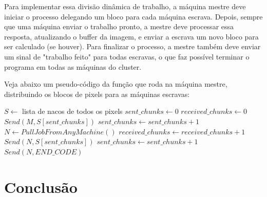 \documentclass[12pt]{article}
\begin{document}
Para implementar essa divisão dinâmica de trabalho, a máquina mestre 
deve iniciar o processo delegando um bloco para cada máquina escrava.
Depois, sempre que uma máquina enviar o trabalho pronto, a mestre deve
processar essa resposta, atualizando o buffer da imagem, e enviar a
escrava um novo bloco para ser calculado (se houver). Para finalizar o
processo, a mestre também deve enviar um sinal de "trabalho feito" para
todas escravas, o que faz possível terminar o programa em todas as 
máquinas do cluster.

Veja abaixo um pseudo-código da função que roda na máquina mestre, 
distribuindo os blocos de pixels para as máquinas escravas:
\begin{algorithmic}[1]
    \State $S \gets $ lista de nacos de todos os pixels
    \State $sent\_chunks \gets 0$
    \State $received\_chunks \gets 0$ 
        \State $Send (M, S[sent\_chunks])$
        \State $sent\_chunks \gets sent\_chunks + 1$
    \EndFor
        \State $N \gets PullJobFromAnyMachine ()$
        \State $received\_chunks \gets received\_chunks + 1$
            \State $Send (N, S[sent\_chunks])$
            \State $sent\_chunks \gets sent\_chunks + 1$
        \Else
            \State $Send (N, END\_CODE)$
        \EndIf
    \EndWhile
\EndFunction
\end{algorithmic}

\newpage
\section{Conclusão}

\newpage
\end{document}

